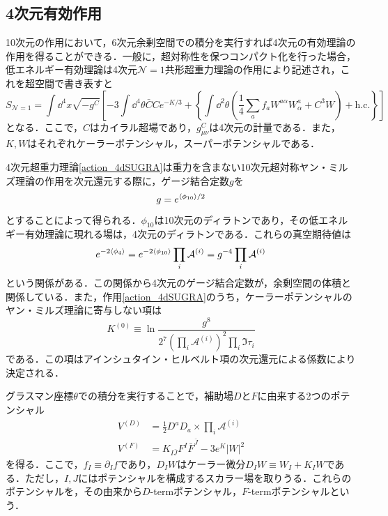 \documentclass[a4paper,uplatex,dvipdfmx]{jsarticle}
\theoremstyle{definition}
\begin{document}
\subsection{4次元有効作用}

10次元の作用において，6次元余剰空間での積分を実行すれば4次元の有効理論の作用を得ることができる．一般に，超対称性を保つコンパクト化を行った場合，低エネルギー有効理論は4次元$\mathcal{N}=1$共形超重力理論\cite{Kaku_SuperconformalUnified_1977}の作用により記述され，これを超空間で書き表すと
\begin{equation}
   S_{\mathcal{N}=1}
   =
   \int\dd^{4}x
   \sqrt{-g^{C}}
   \left[  
      -3\int\dd^4 \theta
      \bar{C}Ce^{-K/3}
      +
      \left\{  
         \int\dd^2\theta
         \left(  
            \frac{1}{4}\sum_{a}f_{a}W^{a\alpha}W_{\alpha}^{a}
            +
            C^3W
         \right)
         +
         \text{h.c.}
      \right\}
   \right]
   \label{action_4dSUGRA}
\end{equation}
となる．ここで，$C$はカイラル超場であり，$g_{\mu\nu}^{C}$は4次元の計量である．また，$K,W$はそれぞれケーラーポテンシャル，スーパーポテンシャルである．

4次元超重力理論\eqref{action_4dSUGRA}は重力を含まない10次元超対称ヤン・ミルズ理論の作用を次元還元する際に，ゲージ結合定数$g$を
\begin{equation}
   g
   =
   e^{\ev*{\phi_{10}}/2}
   \nonumber
\end{equation}
とすることによって得られる．$\phi_{10}$は10次元のディラトンであり，その低エネルギー有効理論に現れる場は，4次元のディラトンである．これらの真空期待値は
\begin{equation}
   e^{-2\ev*{\phi_{4}}}
   =
   e^{-2\ev*{\phi_{10}}}\prod_{i}\mathcal{A}^{(i)}
   =
   g^{-4}\prod_{i}\mathcal{A}^{(i)}
   \nonumber
\end{equation}
という関係がある．この関係から4次元のゲージ結合定数が，余剰空間の体積と関係している．また，作用\eqref{action_4dSUGRA}のうち，ケーラーポテンシャルのヤン・ミルズ理論に寄与しない項は
\begin{equation}
   K^{(0)}
   \equiv
   \ln
   \dfrac{g^{8}}{2^7\left( \prod_{i}\mathcal{A}^{(i)} \right)^2 \prod_{i}\Im \tau_{i}}
   \nonumber
\end{equation}
である．この項はアインシュタイン・ヒルベルト項の次元還元による係数により決定される．

グラスマン座標$\theta$での積分を実行することで，補助場$D$と$F$に由来する2つのポテンシャル
\begin{align}
   V^{(D)}
   &=
   \frac{1}{2}D^{a}D_{a}   
   \times
   \prod_{i}\mathcal{A}^{(i)}
   \label{D-term_potential}
   \\
   V^{(F)}
   &=
   K_{I\bar{J}}F^{I}\bar{F}^{\bar{J}}
   -
   3e^{K}|W|^2
   \label{F-term_potential}
\end{align}
を得る．ここで，$f_{I}\equiv\partial_{I}f$であり，$D_{I}W$はケーラー微分$D_{I}W\equiv W_{I}+K_{I}W$である．ただし，$I,J$にはポテンシャルを構成するスカラー場を取りうる．これらのポテンシャルを，その由来から$D$-termポテンシャル，$F$-termポテンシャルという．
\end{document}
